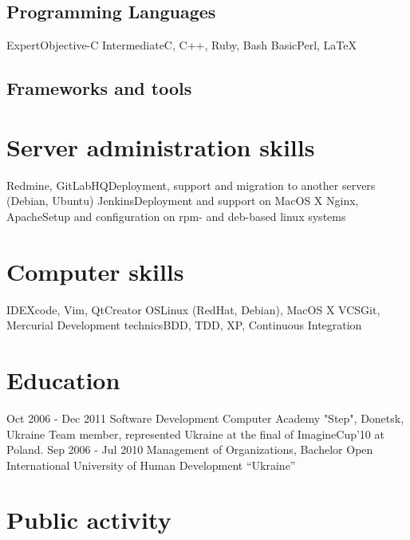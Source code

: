 \documentclass[11pt,a4paper]{moderncv}
\begin{document}
\subsection{Programming Languages}
\cvline
  {Expert}{Objective-C}
\cvline
  {Intermediate}{C, C++, Ruby, Bash}
\cvline
  {Basic}{Perl, LaTeX}
\subsection{Frameworks and tools}

\section{Server administration skills}
\cvline
  {Redmine, GitLabHQ}{Deployment, support and migration to another servers (Debian, Ubuntu)}
\cvline
  {Jenkins}{Deployment and support on MacOS X}
\cvline
  {Nginx, Apache}{Setup and configuration on rpm- and deb-based linux systems}

\section{Computer skills}
  \cvline
  {IDE}{Xcode, Vim, QtCreator}
  \cvline
  {OS}{Linux (RedHat, Debian), MacOS X}
  \cvline
  {VCS}{Git, Mercurial}
  \cvline
  {Development technics}{BDD, TDD, XP, Continuous Integration}

\section{Education}
  \cventry
    {Oct 2006 - Dec 2011}
    {Software Development}
    {Computer Academy "Step", Donetsk, Ukraine}
    {}{}
    {Team member, represented Ukraine at the final of ImagineCup'10 at Poland.}
  \cventry
    {Sep 2006 - Jul 2010}
    {Management of Organizations, Bachelor}
    {Open International University of Human Development “Ukraine”}
    {}{}{}

\section{Public activity}
\end{document}
